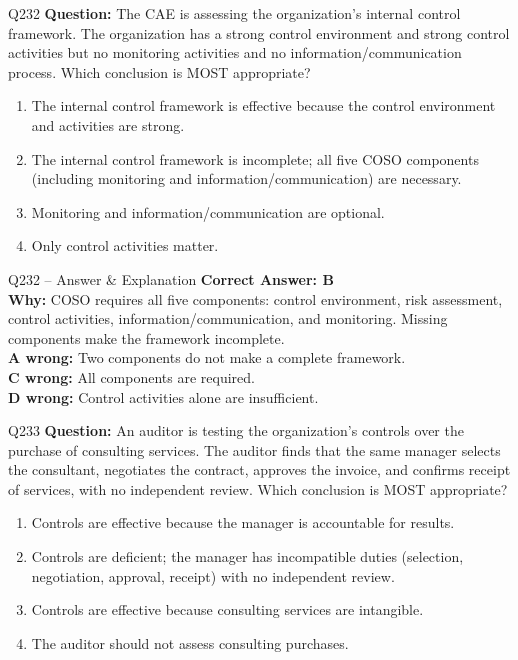 \documentclass[aspectratio=169,10pt]{beamer}
\begin{document}
	\begin{frame}[t]{Q232}
		\small
		\textbf{Question:} The CAE is assessing the organization's internal control framework. The organization has a strong control environment and strong control activities but no monitoring activities and no information/communication process. Which conclusion is MOST appropriate?
		\begin{enumerate}[label=\Alph*.,itemsep=1pt,topsep=2pt]
			\item The internal control framework is effective because the control environment and activities are strong.
			\item The internal control framework is incomplete; all five COSO components (including monitoring and information/communication) are necessary.
			\item Monitoring and information/communication are optional.
			\item Only control activities matter.
		\end{enumerate}
	\end{frame}
	
	\begin{frame}[t]{Q232 -- Answer \& Explanation}
		\small
		\textbf{Correct Answer: B} \\[4pt]
		\textbf{Why:} COSO requires all five components: control environment, risk assessment, control activities, information/communication, and monitoring. Missing components make the framework incomplete. \\[4pt]
		\textbf{A wrong:} Two components do not make a complete framework. \\[2pt]
		\textbf{C wrong:} All components are required. \\[2pt]
		\textbf{D wrong:} Control activities alone are insufficient.
	\end{frame}
	
	\begin{frame}[t]{Q233}
		\small
		\textbf{Question:} An auditor is testing the organization's controls over the purchase of consulting services. The auditor finds that the same manager selects the consultant, negotiates the contract, approves the invoice, and confirms receipt of services, with no independent review. Which conclusion is MOST appropriate?
		\begin{enumerate}[label=\Alph*.,itemsep=1pt,topsep=2pt]
			\item Controls are effective because the manager is accountable for results.
			\item Controls are deficient; the manager has incompatible duties (selection, negotiation, approval, receipt) with no independent review.
			\item Controls are effective because consulting services are intangible.
			\item The auditor should not assess consulting purchases.
		\end{enumerate}
	\end{frame}
	
\end{document}
